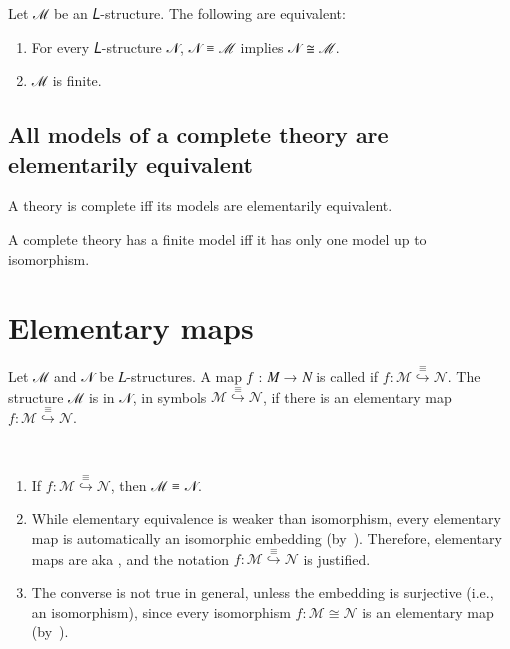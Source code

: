 \documentclass[a4paper,UKenglish,cleveref,autoref,thm-restate,12pt]{lipics-v2021-wjd}
\newcommand{\<}{\langle}
\renewcommand{\>}{\rangle}
\begin{document}
\begin{lemma}
Let ℳ be an 𝐿-structure. The following are equivalent:
\begin{enumerate}
\item For every 𝐿-structure 𝒩, 𝒩 ≡ ℳ implies 𝒩 ≅ ℳ.
\item ℳ is finite.
\end{enumerate}
\end{lemma}

\subsection{All models of a complete theory are elementarily equivalent}\label{all-models-of-a-complete-theory-are-elementarily-equivalent}

\begin{lemma}
 A theory is complete iff its models are elementarily equivalent.
\end{lemma}

\begin{corollary}
 A complete theory has a finite model iff it has only one model up to isomorphism.
\end{corollary}

\section{Elementary maps}\label{elementary-maps}
Let ℳ and 𝒩 be 𝐿-structures. A map 𝑓 : 𝑀 → 𝑁 is called  if
\(f : ℳ \stackrel{≡}{↪} 𝒩\).
The structure ℳ is  in 𝒩, in symbols
\(ℳ \stackrel{≡}{↪} 𝒩\), if there is an elementary map \(f : ℳ \stackrel{≡}{↪} 𝒩\).\\[6pt]
\begin{remarks*}\
\begin{enumerate}
\item
  If \(f : ℳ \stackrel{≡}{↪} 𝒩\), then ℳ ≡ 𝒩.
\item
  While elementary equivalence is weaker than isomorphism, every elementary
  map is automatically an isomorphic embedding
  (by~\cite[Lemma 6.1.2(1)]{Rothmaler:2000}). Therefore, elementary maps are
  aka \defn{elementary embeddings}, and the notation
  \(f : ℳ \stackrel{≡}{↪} 𝒩\) is justified.
\item
  The converse is not true in general, unless the embedding is surjective
  (i.e., an isomorphism), since every isomorphism \(f : ℳ \cong 𝒩\) is an
  elementary map (by~\cite[Prop 6.1.3]{Rothmaler:2000}).
\end{enumerate}
\end{remarks*}
\end{document}

